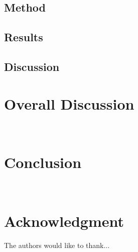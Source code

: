 \documentclass[conference]{IEEEtran}
\begin{document}
\subsection{Method}
\subsection{Results}
\subsection{Discussion}
\section{Overall Discussion}

~\cite{Sorg2003VisualTA}
\section{Conclusion}
~\cite{forpheus}
~\cite{WilliamsII2003}
~\cite{festofin}


\section*{Acknowledgment}


The authors would like to thank...








%
%
{}

\end{document}
